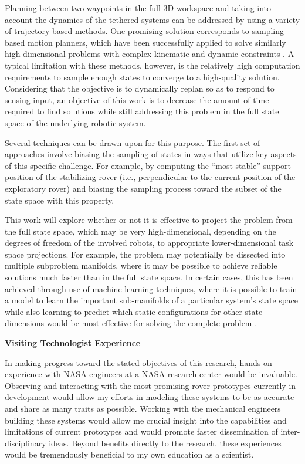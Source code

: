 \documentclass[12pt]{article}
\newcommand{\kostas}[1]{{\color{blue} #1}}
\begin{document}
Planning between two waypoints in the full 3D workspace and taking
into account the dynamics of the tethered systems can be addressed by
using a variety of trajectory-based methods. One promising solution
corresponds to sampling-based motion planners, which have been
successfully applied to solve similarly high-dimensional problems with
complex kinematic and dynamic constraints \cite{zak_kino}. A typical
limitation with these methods, however, is the relatively high
computation requirements to sample enough states to converge to a
high-quality solution. Considering that the objective is to
dynamically replan so as to respond to sensing input, an objective of
this work is to decrease the amount of time required to find solutions
while still addressing this problem in the full state space of the
underlying robotic system.


Several techniques can be drawn upon for this purpose. The first set
of approaches involve biasing the sampling of states in ways that
utilize key aspects of this specific challenge. For example, by
computing the ``most stable'' support position of the stabilizing
rover (i.e., perpendicular to the current position of the exploratory
rover) and biasing the sampling process toward the subset of the state
space with this property. 

This work will explore whether or not it
is effective to project the problem from the full state space, which
may be very high-dimensional, depending on the degrees of freedom of
the involved robots, to appropriate lower-dimensional task space
projections. For example, the problem may potentially be dissected 
into multiple subproblem
manifolds, where it may be possible to achieve reliable solutions much
faster than in the full state space. In certain cases, this has been
achieved through use of machine learning techniques, where it is
possible to train a model to learn the important sub-manifolds of a
particular system's state space while also learning to predict which
static configurations for other state dimensions would be most
effective for solving the complete problem \cite{learning_biases}.


{\bf\noindent Visiting Technologist Experience}

In making progress toward the stated objectives of this research, hands-on experience with NASA 
engineers at a NASA research center would be invaluable. Observing and interacting with the most promising 
rover prototypes currently in development would allow my efforts in modeling these systems to be as accurate 
and share as many traits as possible. Working with the mechanical engineers building these systems would 
allow me crucial insight into the capabilities and limitations of current prototypes and would promote 
faster dissemination of inter-disciplinary ideas. Beyond benefits directly to the research, these experiences 
would be tremendously beneficial to my own education as a scientist. 
\end{document}

